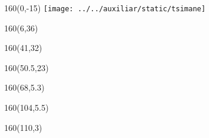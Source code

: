 \documentclass[shownotes,aspectratio=169]{beamer}
\newcounter{capitulo}
\newcommand{\unidad}{\thecapitulo \stepcounter{capitulo}}
\begin{document}
\begin{frame}

\begin{textblock}{160}(0,-15)
\texttt{[image: ../../auxiliar/static/tsimane]}
\end{textblock}


\begin{textblock}{160}(6,36)
\LARGE {}
\end{textblock}
\begin{textblock}{160}(41,32)
\LARGE {}
\end{textblock}
\begin{textblock}{160}(50.5,23)
\LARGE {}
\end{textblock}
\begin{textblock}{160}(68,5.3)
\LARGE {}
\end{textblock}
\begin{textblock}{160}(104,5.5)
\LARGE {}
\end{textblock}
\begin{textblock}{160}(110,3)
\LARGE {}
\end{textblock}

%
%


\end{frame}
\end{document}

